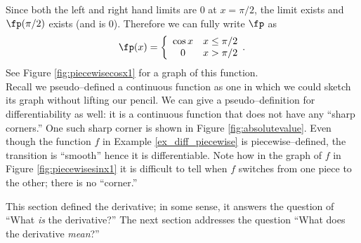 {%
Since both the left and right hand limits are 0 at $x=\pi/2$, the limit exists and $\fp(\pi/2)$ exists (and is 0). Therefore we can fully write $\fp$ as $$\fp(x) = \left\{\begin{array}{cc} \cos x & x\leq\pi/2\\ 0 & x>\pi/2\end{array}.\right.$$ See Figure \ref{fig:piecewisecosx1} for a graph of this function.
}\\

Recall we pseudo--defined a continuous function as one in which we could sketch its graph without lifting our pencil. We can give a pseudo--definition for differentiability as well: it is a continuous function that does not have any ``sharp corners.'' One such sharp corner is shown in Figure \ref{fig:absolutevalue}. Even though the function $f$ in Example \ref{ex_diff_piecewise} is piecewise--defined, the transition is ``smooth'' hence it is differentiable. Note how in the graph of $f$ in Figure \ref{fig:piecewisesinx1} it is difficult to tell when $f$ switches from one piece to the other; there is no ``corner.''

This section defined the derivative; in some sense, it answers the question of ``What \textit{is} the derivative?'' The next section addresses the question ``What does the derivative \textit{mean}?''



